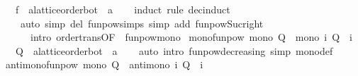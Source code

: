 \begin{isabellebody}
\ \ \ f\ {\isacharcolon}{\kern0pt}{\isacharcolon}{\kern0pt}\ {\isachardoublequoteopen}{\isacharprime}{\kern0pt}a{\isacharcolon}{\kern0pt}{\isacharcolon}{\kern0pt}{\isacharbraceleft}{\kern0pt}lattice{\isacharcomma}{\kern0pt}order{\isacharunderscore}{\kern0pt}bot{\isacharbraceright}{\kern0pt}\ {\isasymRightarrow}\ {\isacharprime}{\kern0pt}a{\isachardoublequoteclose}\isanewline
%
\isadelimproof
\ \ %
\endisadelimproof
%
\isatagproof
{}\isamarkupfalse%
\ {\isacharparenleft}{\kern0pt}induct\ rule{\isacharcolon}{\kern0pt}\ dec{\isacharunderscore}{\kern0pt}induct{\isacharparenright}{\kern0pt}\isanewline
\ \ \ \ {\isacharparenleft}{\kern0pt}auto\ simp\ del{\isacharcolon}{\kern0pt}\ funpow{\isachardot}{\kern0pt}simps{\isacharparenleft}{\kern0pt}{}{\isacharparenright}{\kern0pt}\ simp\ add{\isacharcolon}{\kern0pt}\ funpow{\isacharunderscore}{\kern0pt}Suc{\isacharunderscore}{\kern0pt}right\isanewline
\ \ \ \ \ \ intro{\isacharcolon}{\kern0pt}\ order{\isacharunderscore}{\kern0pt}trans{\isacharbrackleft}{\kern0pt}OF\ {\isacharunderscore}{\kern0pt}\ funpow{\isacharunderscore}{\kern0pt}mono{\isacharbrackright}{\kern0pt}{\isacharparenright}{\kern0pt}%
\endisatagproof
{\isafoldproof}%
%
\isadelimproof
\isanewline
%
\endisadelimproof
\isanewline
{}\isamarkupfalse%
\ mono{\isacharunderscore}{\kern0pt}funpow{\isacharcolon}{\kern0pt}\ {\isachardoublequoteopen}mono\ Q\ {\isasymLongrightarrow}\ mono\ {\isacharparenleft}{\kern0pt}{\isasymlambda}i{\isachardot}{\kern0pt}\ {\isacharparenleft}{\kern0pt}Q\ {\isacharcircum}{\kern0pt}{\isacharcircum}{\kern0pt}\ i{\isacharparenright}{\kern0pt}\ {\isasymbottom}{\isacharparenright}{\kern0pt}{\isachardoublequoteclose}\isanewline
\ \ \ Q\ {\isacharcolon}{\kern0pt}{\isacharcolon}{\kern0pt}\ {\isachardoublequoteopen}{\isacharprime}{\kern0pt}a{\isacharcolon}{\kern0pt}{\isacharcolon}{\kern0pt}{\isacharbraceleft}{\kern0pt}lattice{\isacharcomma}{\kern0pt}order{\isacharunderscore}{\kern0pt}bot{\isacharbraceright}{\kern0pt}\ {\isasymRightarrow}\ {\isacharprime}{\kern0pt}a{\isachardoublequoteclose}\isanewline
%
\isadelimproof
\ \ %
\endisadelimproof
%
\isatagproof
{}\isamarkupfalse%
\ {\isacharparenleft}{\kern0pt}auto\ intro{\isacharbang}{\kern0pt}{\isacharcolon}{\kern0pt}\ funpow{\isacharunderscore}{\kern0pt}decreasing\ simp{\isacharcolon}{\kern0pt}\ mono{\isacharunderscore}{\kern0pt}def{\isacharparenright}{\kern0pt}%
\endisatagproof
{\isafoldproof}%
%
\isadelimproof
\isanewline
%
\endisadelimproof
\isanewline
{}\isamarkupfalse%
\ antimono{\isacharunderscore}{\kern0pt}funpow{\isacharcolon}{\kern0pt}\ {\isachardoublequoteopen}mono\ Q\ {\isasymLongrightarrow}\ antimono\ {\isacharparenleft}{\kern0pt}{\isasymlambda}i{\isachardot}{\kern0pt}\ {\isacharparenleft}{\kern0pt}Q\ {\isacharcircum}{\kern0pt}{\isacharcircum}{\kern0pt}\ i{\isacharparenright}{\kern0pt}\ {\isasymtop}{\isacharparenright}{\kern0pt}{\isachardoublequoteclose}\isanewline

\end{isabellebody}
